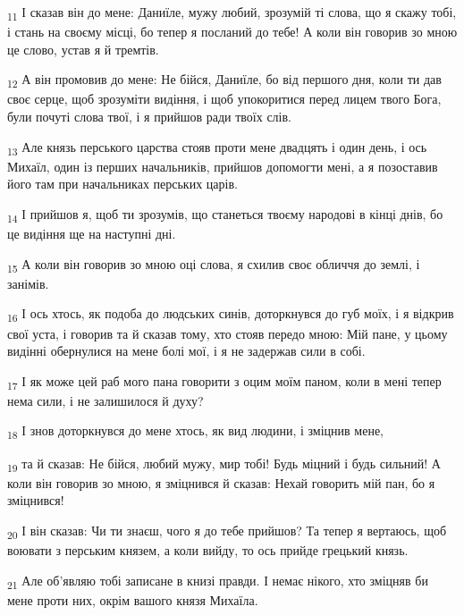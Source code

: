 \begin{tcolorbox}
\textsubscript{11} І сказав він до мене: Даниїле, мужу любий, зрозумій ті слова, що я скажу тобі, і стань на своєму місці, бо тепер я посланий до тебе! А коли він говорив зо мною це слово, устав я й тремтів.
\end{tcolorbox}
\begin{tcolorbox}
\textsubscript{12} А він промовив до мене: Не бійся, Даниїле, бо від першого дня, коли ти дав своє серце, щоб зрозуміти видіння, і щоб упокоритися перед лицем твого Бога, були почуті слова твої, і я прийшов ради твоїх слів.
\end{tcolorbox}
\begin{tcolorbox}
\textsubscript{13} Але князь перського царства стояв проти мене двадцять і один день, і ось Михаїл, один із перших начальників, прийшов допомогти мені, а я позоставив його там при начальниках перських царів.
\end{tcolorbox}
\begin{tcolorbox}
\textsubscript{14} І прийшов я, щоб ти зрозумів, що станеться твоєму народові в кінці днів, бо це видіння ще на наступні дні.
\end{tcolorbox}
\begin{tcolorbox}
\textsubscript{15} А коли він говорив зо мною оці слова, я схилив своє обличчя до землі, і занімів.
\end{tcolorbox}
\begin{tcolorbox}
\textsubscript{16} І ось хтось, як подоба до людських синів, доторкнувся до губ моїх, і я відкрив свої уста, і говорив та й сказав тому, хто стояв передо мною: Мій пане, у цьому видінні обернулися на мене болі мої, і я не задержав сили в собі.
\end{tcolorbox}
\begin{tcolorbox}
\textsubscript{17} І як може цей раб мого пана говорити з оцим моїм паном, коли в мені тепер нема сили, і не залишилося й духу?
\end{tcolorbox}
\begin{tcolorbox}
\textsubscript{18} І знов доторкнувся до мене хтось, як вид людини, і зміцнив мене,
\end{tcolorbox}
\begin{tcolorbox}
\textsubscript{19} та й сказав: Не бійся, любий мужу, мир тобі! Будь міцний і будь сильний! А коли він говорив зо мною, я зміцнився й сказав: Нехай говорить мій пан, бо я зміцнився!
\end{tcolorbox}
\begin{tcolorbox}
\textsubscript{20} І він сказав: Чи ти знаєш, чого я до тебе прийшов? Та тепер я вертаюсь, щоб воювати з перським князем, а коли вийду, то ось прийде грецький князь.
\end{tcolorbox}
\begin{tcolorbox}
\textsubscript{21} Але об'являю тобі записане в книзі правди. І немає нікого, хто зміцняв би мене проти них, окрім вашого князя Михаїла.
\end{tcolorbox}
